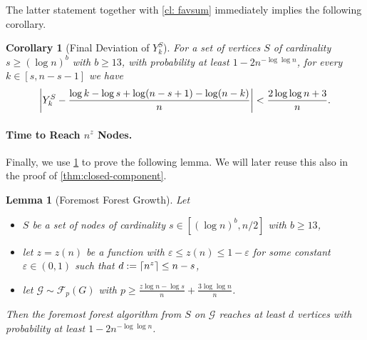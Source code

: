\documentclass[a4paper,11pt]{article}
\theoremstyle{definition}
\theoremstyle{plain}
\newtheorem{lemma}{Lemma}
\newtheorem{corollary}{Corollary}
\newcommand{\FFF}{\mathcal{F}}
\newcommand{\GGG}{\mathcal{G}}
\DeclarePairedDelimiter{\abs}{\lvert}{\rvert}
\DeclarePairedDelimiter\ceil{\lceil}{\rceil}
\begin{document}
The latter statement together with \cref{cl: favsum} immediately implies the following corollary.
\begin{corollary}[Final Deviation of $Y^S_k$]\label{th:YConcEasy}
  For a set of vertices $S$ of cardinality $ s\ge(\log n)^b$ with $b\ge 13$, with probability at least $1 - 2n^{-\log\log n}$, for every $k\in[ s, n- s-1]$ we have
  \[
  \abs*{Y_k^S - \frac{\log k - \log  s + \log (n -  s + 1) - \log(n - k)}{n}} < \frac{2\log\log n + 3}{n}.
  \]
\end{corollary}

\paragraph*{Time to Reach $n^z$ Nodes.}
Finally, we use \cref{th:YConcEasy} to prove the following lemma.
We will later reuse this also in the proof of \cref{thm:closed-component}.
\begin{lemma}[Foremost Forest Growth]\label{lem: reachability}
  Let
    \begin{itemize}
      \item $S$ be a set of nodes of cardinality $s\in [(\log n)^{b}, n/2]$ with $b\ge 13$,
      \item let $z=z(n)$ be a function with $\varepsilon\le z(n)\le 1 - \varepsilon$ for some constant $\varepsilon\in (0, 1)$ such that $d:=\ceil*{n^z} \leq n-s$,
      \item let $\GGG\sim \FFF_{p}(G)$ with $p\ge \frac{z\log n -\log s}{n} +\frac{3\log\log n}{n}$.
  \end{itemize}
    Then the foremost forest algorithm from $S$ on $\GGG$ reaches at least $d$ vertices with probability at least $1 - 2n^{-\log \log n}$.
\end{lemma}
\end{document}

